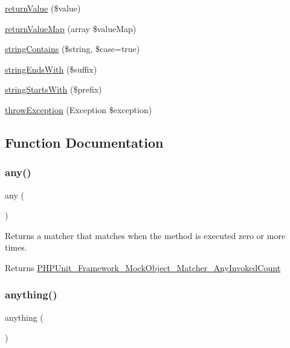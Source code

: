 \begin{DoxyCompactItemize}
\item 
\mbox{\hyperlink{_functions_8php_abde2df1d4e6445dc0068e921223f2b48}{return\+Value}} (\$value)
\item 
\mbox{\hyperlink{_functions_8php_a01296977f98af86b301ee52ed691d9fa}{return\+Value\+Map}} (array \$value\+Map)
\item 
\mbox{\hyperlink{_functions_8php_ada7cba8fd03436d2fd206d7bb778fe83}{string\+Contains}} (\$string, \$case=true)
\item 
\mbox{\hyperlink{_functions_8php_a9c953f13455d2223733666f39b4e70c6}{string\+Ends\+With}} (\$suffix)
\item 
\mbox{\hyperlink{_functions_8php_afaa81aac86007c5317666a5b78f9d013}{string\+Starts\+With}} (\$prefix)
\item 
\mbox{\hyperlink{_functions_8php_afb912a3fd2baac7f6fbaea23ca792819}{throw\+Exception}} (Exception \$exception)
\end{DoxyCompactItemize}


\subsection{Function Documentation}
\mbox{\label{_functions_8php_aa950afcee01981fe0485ce00ff0e8e8c}} 
\subsubsection{\texorpdfstring{any()}{any()}}
{\footnotesize\ttfamily any (\begin{DoxyParamCaption}{ }\end{DoxyParamCaption})}

Returns a matcher that matches when the method is executed zero or more times.

\begin{DoxyReturn}{Returns}
\mbox{\hyperlink{class_p_h_p_unit___framework___mock_object___matcher___any_invoked_count}{P\+H\+P\+Unit\+\_\+\+Framework\+\_\+\+Mock\+Object\+\_\+\+Matcher\+\_\+\+Any\+Invoked\+Count}} 
\end{DoxyReturn}
\mbox{\label{_functions_8php_a7b7acdbecdca53ad57267d743ede7653}} 
\subsubsection{\texorpdfstring{anything()}{anything()}}
{\footnotesize\ttfamily anything (\begin{DoxyParamCaption}{ }\end{DoxyParamCaption})}

